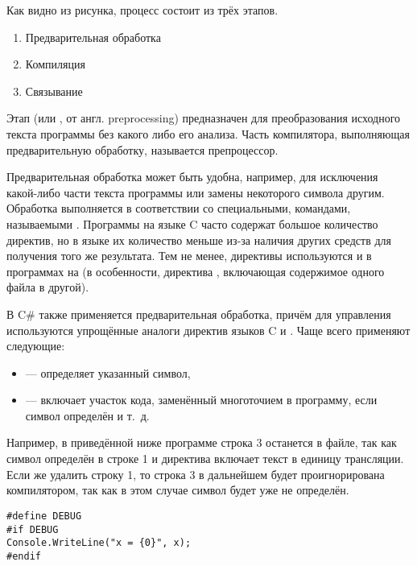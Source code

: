 Как видно из рисунка, процесс состоит из трёх этапов.

\begin{enumerate}
\item Предварительная обработка
\item Компиляция
\item Связывание
\end{enumerate}

Этап  (или
, от англ. preprocessing)
предназначен для преобразования исходного текста программы без какого
либо его анализа. Часть компилятора, выполняющая предварительную
обработку, называется препроцессор.

Предварительная обработка может быть удобна, например, для исключения
какой-либо части текста программы или замены некоторого символа
другим.  Обработка выполняется в соответствии со специальными,
командами, называемыми . Программы на языке C часто содержат большое
количество директив, но в языке \CPP их количество меньше из-за наличия
других средств для получения того же результата. Тем не менее,
директивы используются и в программах на \CPP (в особенности, директива
, включающая содержимое одного файла в другой).

В C\# также применяется предварительная обработка, причём для
управления используются упрощённые аналоги директив языков C и
\CPP. Чаще всего применяют следующие:

\begin{itemize}
\item {} — определяет указанный
  символ,
\item {} —
  включает участок кода, заменённый многоточием в программу, если
  символ определён и т.~д.
\end{itemize}

Например, в приведённой ниже программе строка 3 останется в файле, так
как символ  определён в строке 1 и директива
 включает текст в единицу трансляции. Если же удалить
строку 1, то строка 3 в дальнейшем будет проигнорирована компилятором,
так как в этом случае символ  будет уже не определён.

\begin{lstlisting}
#define DEBUG
#if DEBUG
Console.WriteLine("x = {0}", x);
#endif
\end{lstlisting}

